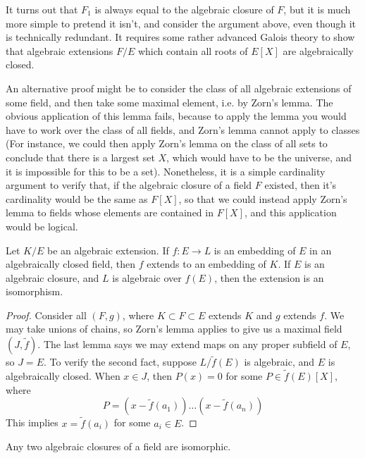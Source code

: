 \begin{remark}
	It turns out that $F_1$ is always equal to the algebraic closure of $F$, but it is much more simple to pretend it isn't, and consider the argument above, even though it is technically redundant. It requires some rather advanced Galois theory to show that algebraic extensions $F/E$ which contain all roots of $E[X]$ are algebraically closed.
\end{remark}

An alternative proof might be to consider the class of all algebraic extensions of some field, and then take some maximal element, i.e. by Zorn's lemma. The obvious application of this lemma fails, because to apply the lemma you would have to work over the class of all fields, and Zorn's lemma cannot apply to classes (For instance, we could then apply Zorn's lemma on the class of all sets to conclude that there is a largest set $X$, which would have to be the universe, and it is impossible for this to be a set). Nonetheless, it is a simple cardinality argument to verify that, if the algebraic closure of a field $F$ existed, then it's cardinality would be the same as $F[X]$, so that we could instead apply Zorn's lemma to fields whose elements are contained in $F[X]$, and this application would be logical.

\begin{theorem}
    Let $K/E$ be an algebraic extension. If $f:E \to L$ is an embedding of $E$ in an algebraically closed field, then $f$ extends to an embedding of $K$. If $E$ is an algebraic closure, and $L$ is algebraic over $f(E)$, then the extension is an isomorphism.
\end{theorem}
\begin{proof}
    Consider all $(F,g)$, where $K \subset F \subset E$ extends $K$ and $g$ extends $f$. We may take unions of chains, so Zorn's lemma applies to give us a maximal field $(J,\tilde{f})$. The last lemma says we may extend maps on any proper subfield of $E$, so $J = E$. To verify the second fact, suppose $L/\tilde{f}(E)$ is algebraic, and $E$ is algebraically closed. When $x \in J$, then $P(x) = 0$ for some $P \in \tilde{f}(E)[X]$, where
    \[ P = (x - \tilde{f}(a_1)) \dots (x - \tilde{f}(a_n)) \]
    This implies $x = \tilde{f}(a_i)$ for some $a_i \in E$.
\end{proof}

\begin{corollary}
    Any two algebraic closures of a field are isomorphic.
\end{corollary}






